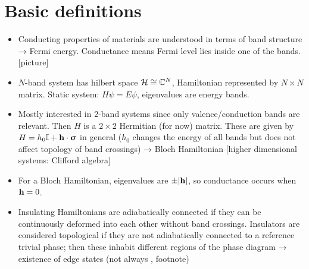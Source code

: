 



\section{Basic definitions}
{\color{blue}
\begin{itemize}
	\item Conducting properties of materials are understood in terms of band structure → Fermi energy. Conductance means Fermi level lies inside one of the bands. [picture]
	
	\item $N$-band system has hilbert space $\mathcal{H}\cong\mathbb{C}^N$, Hamiltonian represented by $N\times N$ matrix. Static system: $H\psi = E\psi$, eigenvalues are energy bands.
	
	\item Mostly interested in 2-band systems since only valence/conduction bands are relevant. Then $H$ is a $2\times 2$ Hermitian (for now) matrix. These are given by $H = h_0\mathbb{I} + \vb{h}\cdot\bm{\upsigma}$ in general ($h_0$ changes the energy of all bands but does not affect topology of band crossings) → Bloch Hamiltonian [higher dimensional systems: Clifford algebra]
	
	\item For a Bloch Hamiltonian, eigenvalues are $\pm\abs{\vb{h}}$, so conductance occurs when $\vb{h} = 0$.
	
	\item Insulating Hamiltonians are adiabatically connected if they can be continuously deformed into each other without band crossings. Insulators are considered topological if they are not adiabatically connected to a reference trivial phase; then these inhabit different regions of the phase diagram → existence of edge states (not always \cite{Bernevig_topological-insulators}, footnote)
\end{itemize}
}

